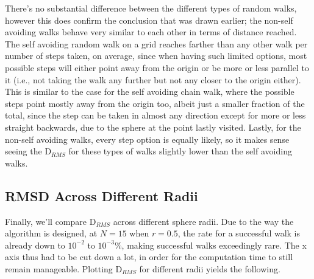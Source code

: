 \documentclass[a4paper,12pt]{article}
\begin{document}
There's no substantial difference between the different types of random walks, however this does confirm the
conclusion that was drawn earlier; the non-self avoiding walks behave very similar to each other in terms of
distance reached. The self avoiding random walk on a grid reaches farther than any other walk per number of steps
taken, on average, since when having such limited options, most possible steps will either point away from the
origin or be more or less parallel to it (i.e., not taking the walk any further but not any closer to the origin
either). This is similar to the case for the self avoiding chain walk, where the possible steps point mostly away
from the origin too, albeit just a smaller fraction of the total, since the step can be taken in almost any direction
except for more or less straight backwards, due to the sphere at the point lastly visited. Lastly, for the non-self
avoiding walks, every step option is equally likely, so it makes sense seeing the $\mathrm{D}_{RMS}$ for these types
of walks slightly lower than the self avoiding walks.

\subsection*{RMSD Across Different Radii}

Finally, we'll compare $\mathrm{D}_{RMS}$ across different sphere radii. Due to the way the algorithm is designed,
at $N = 15$ when $r = 0.5$, the rate for a successful walk is already down to $10^{-2}$ to $10^{-3} \%$,
making successful walks exceedingly rare. The x axis thus had to be cut down a lot, in order for the computation time
to still remain manageable. Plotting $\mathrm{D}_{RMS}$ for different radii yields the following.
\end{document}
